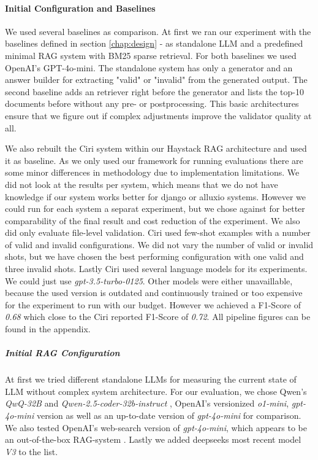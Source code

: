 \paragraph{Initial Configuration and Baselines} \label{sec:exp_initial_config}
We used several baselines as comparison. At first we ran our experiment with the baselines defined in section \ref{chap:design} - as standalone LLM and a predefined minimal RAG system with BM25 sparse retrieval. For both baselines we used OpenAI's GPT-4o-mini\cite{OpenAI_2022}. The standalone system has only a generator and an answer builder for extracting "valid" or "invalid" from the generated output. The second baseline adds an retriever right before the generator and lists the top-10 documents before without any pre- or postprocessing. This basic architectures ensure that we figure out if complex adjustments improve the validator quality at all.

We also rebuilt the Ciri system within our Haystack RAG architecture and used it as baseline. As we only used our framework for running evaluations there are some minor differences in methodology due to implementation limitations. We did not look at the results per system, which means that we do not have knowledge if our system works better for django or alluxio systems. However we could run for each system a separat experiment, but we chose against for better comparability of the final result and cost reduction of the experiment. We also did only evaluate file-level validation. Ciri used few-shot examples with a number of valid and invalid configurations. We did not vary the number of valid or invalid shots, but we have chosen the best performing configuration with one valid and three invalid shots. Lastly Ciri used several language models for its experiments. We could just use \textit{gpt-3.5-turbo-0125}\cite{OpenAI_2022}. Other models were either unavaillable, because the used version is outdated and continuously trained or too expensive for the experiment to run with our budget. However we achieved a F1-Score of \textit{0.68} which close to the Ciri reported F1-Score of \textit{0.72}. All pipeline figures can be found in the appendix.

\subparagraph{Initial RAG Configuration} 
At first we tried different standalone LLMs for measuring the current state of LLM without complex system architecture. For our evaluation, we chose Qwen's \textit{QwQ-32B} \cite{qwq32b} and \textit{Qwen-2.5-coder-32b-instruct} \cite{hui2024qwen2}\cite{qwen2}\cite{qwen2.5}, OpenAI's versionized \textit{o1-mini}, \textit{gpt-4o-mini} version as well as an up-to-date version of \textit{gpt-4o-mini} for comparison. We also tested OpenAI's web-search version of \textit{gpt-4o-mini}, which appears to be an out-of-the-box RAG-system \cite{OpenAI_2022}. Lastly we added deepseeks most recent model \textit{V3} \cite{deepseekai2024deepseekv3technicalreport} to the list. 

